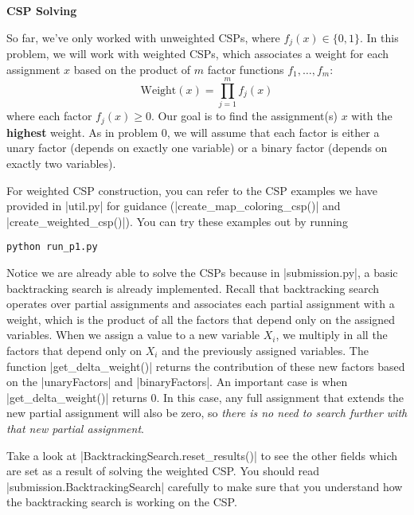 \item {\bf CSP Solving}

So far, we've only worked with unweighted CSPs, where $f_j(x)\in\{0,1\}$. In
this problem, we will work with weighted CSPs, which associates a weight for
each assignment $x$ based on the product of $m$ factor functions $f_1, \dots,
f_m$:
\[\text{Weight}(x) = \prod^m_{j=1}f_j(x)\]
where each factor $f_j(x)\geq 0$. Our goal is to find the assignment(s) $x$ with
the {\bf highest} weight. As in problem 0, we will assume that each factor is
either a unary factor (depends on exactly one variable) or a binary factor
(depends on exactly two variables).

For weighted CSP construction, you can refer to the CSP examples we have
provided in |util.py| for guidance (|create_map_coloring_csp()| and
|create_weighted_csp()|). You can try these examples out by running

\begin{lstlisting}
python run_p1.py
\end{lstlisting}

Notice we are already able to solve the CSPs because in |submission.py|, a basic
backtracking search is already implemented. Recall that backtracking search
operates over partial assignments and associates each partial assignment with a
weight, which is the product of all the factors that depend only on the assigned
variables. When we assign a value to a new variable $X_i$, we multiply in all
the factors that depend only on $X_i$ and the previously assigned variables. The
function |get_delta_weight()| returns the contribution of these new factors
based on the |unaryFactors| and |binaryFactors|. An important case is when
|get_delta_weight()| returns 0. In this case, any full assignment that extends
the new partial assignment will also be zero, so {\em there is no need to search
further with that new partial assignment}.

Take a look at |BacktrackingSearch.reset_results()| to see the other fields
which are set as a result of solving the weighted CSP. You should read
|submission.BacktrackingSearch| carefully to make sure that you understand how
the backtracking search is working on the CSP.

\begin{enumerate}

  

  

\end{enumerate}
